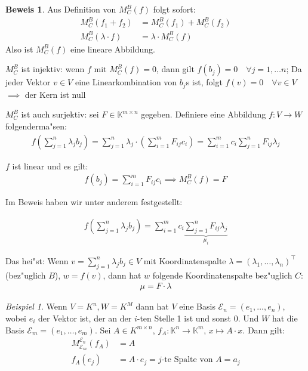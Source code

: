 \documentclass[11pt]{article}
\theoremstyle{remark}
\newtheorem{exa}{Beispiel}[section]
\theoremstyle{definition}
\newtheorem{prof}{Beweis}
\theoremstyle{remark}
\begin{document}
\begin{prof}
Aus Definition von \(M_C^B(f)\) folgt sofort:
\begin{align*}
M^B_C(f_1 + f_2) &= M_C^B(f_1) + M_C^B(f_2)\\
M^B_C(\lambda\cdot f) &= \lambda\cdot M_C^B(f)
\end{align*}
Also ist \(M_C^B(f)\) eine lineare
Abbildung.

\(M_C^B\) ist injektiv: wenn \(f\) mit \(M^B_C(f) = 0\), dann gilt \(f(b_j) = 0\quad\forall j= 1,\dots n\); Da jeder Vektor \(v \in V\) eine Linearkombination von \(b_j\)s ist, folgt \(f(v) = 0 \quad\forall v \in V\) \(\implies\) der Kern ist null

\(M^B_C\) ist auch surjektiv: sei \(F\in \mathbb{K}^{m\times n}\) gegeben. Definiere eine Abbildung \(f: V\to W\) folgenderma"sen:
\begin{align*}
f\left(\sum_{j=1}^n\lambda_jb_j\right) = \sum_{j=1}^n\lambda_j\cdot\left(\sum_{i=1}^mF_{ij}c_i\right)=\sum_{i=1}^mc_i\sum_{j=1}^nF_{ij}\lambda_j
\end{align*}

\(f\) ist linear und es gilt:
\begin{align*}
f(b_j) = \sum_{i=1}^mF_{ij}c_i \implies M^B_C(f) = F
\end{align*}
\end{prof}

Im Beweis haben wir unter anderem festgestellt:
\begin{relation}
\begin{align*}
f\left(\sum_{j=1}^n\lambda_jb_j\right)=\sum_{i=1}^mc_i\underbrace{\sum_{j=1}^nF_{ij}\lambda_j}_{\mu_i}
\end{align*}

Das hei"st: Wenn \(v=\sum_{j=1}^n\lambda_jb_j\in V\) mit Koordinatenspalte \(\lambda = (\lambda_1,\dots,\lambda_n)^\top\) (bez"uglich \(B\)), \(w = f(v)\), dann hat \(w\) folgende Koordinatenspalte bez"uglich \(C\):
\begin{align}
\mu = F\cdot \lambda
\end{align}
\end{relation}

\begin{exa}
Wenn \(V=K^n, W=K^M\) dann hat \(V\) eine Basis \(\mathcal{E}_n = (e_1, \dots, e_n)\), wobei \(e_i\) der Vektor ist, der an der \(i\)-ten Stelle 1 ist und sonst 0. Und \(W\) hat die Basis \(\mathcal{E}_m = (e_1, \dots, e_m)\).
Sei \(A\in K^{m\times n }\), \(f_A: \mathbb{K}^n\to \mathbb{K}^m\), \(x \mapsto A\cdot x\). Dann gilt:
\begin{align*}
M^{\mathcal{E}_n}_{\mathcal{E}_m}(f_A) &= A\\
f_A(e_j) &= A\cdot e_j = j\text{-te Spalte von } A = a_j
\end{align*}
\end{exa}
\end{document}
